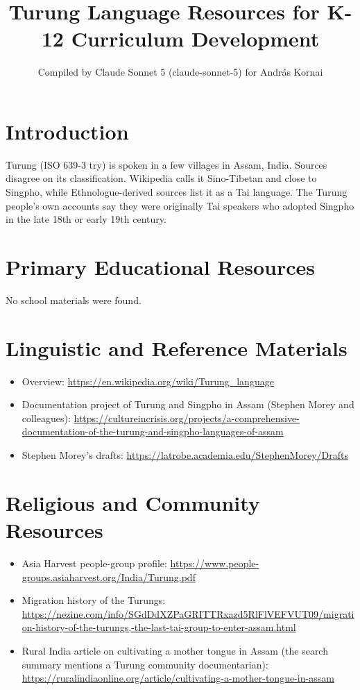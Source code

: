 \documentclass[12pt]{article}
\title{Turung Language Resources for K-12 Curriculum Development}
\author{Compiled by Claude Sonnet 5 (claude-sonnet-5) for Andr\'as Kornai}
\date{}
\begin{document}
\maketitle
\section{Introduction}
Turung (ISO 639-3 try) is spoken in a few villages in Assam, India. Sources disagree on its classification. Wikipedia calls it Sino-Tibetan and close to Singpho, while Ethnologue-derived sources list it as a Tai language. The Turung people's own accounts say they were originally Tai speakers who adopted Singpho in the late 18th or early 19th century.
\section{Primary Educational Resources}
No school materials were found.
\section{Linguistic and Reference Materials}
\begin{itemize}
\item Overview: \url{https://en.wikipedia.org/wiki/Turung_language}
\item Documentation project of Turung and Singpho in Assam (Stephen Morey and colleagues): \url{https://cultureincrisis.org/projects/a-comprehensive-documentation-of-the-turung-and-singpho-languages-of-assam}
\item Stephen Morey's drafts: \url{https://latrobe.academia.edu/StephenMorey/Drafts}
\end{itemize}
\section{Religious and Community Resources}
\begin{itemize}
\item Asia Harvest people-group profile: \url{https://www.people-groups.asiaharvest.org/India/Turung.pdf}
\item Migration history of the Turungs: \url{https://nezine.com/info/SGdDdXZPaGRITTRxazd5RlFlVEFVUT09/migration-history-of-the-turungs,-the-last-tai-group-to-enter-assam.html}
\item Rural India article on cultivating a mother tongue in Assam (the search summary mentions a Turung community documentarian): \url{https://ruralindiaonline.org/article/cultivating-a-mother-tongue-in-assam}
\end{itemize}
\end{document}
